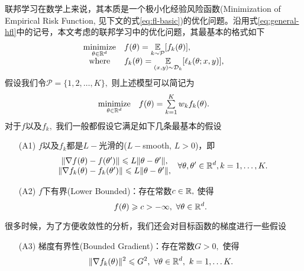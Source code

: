 联邦学习在数学上来说，其本质是一个极小化经验风险函数(Minimization of Empirical Risk Function, 见下文的式\eqref{eq:fl-basic})的优化问题。沿用式\eqref{eq:general-hfl}中的记号，本文考虑的联邦学习中的优化问题，其最基本的格式如下
\begin{equation}
\label{eq:fl-basic-dist}
\begin{array}{cl}
\operatorname*{minimize}\limits_{\theta \in \mathbb{R}^d} & f(\theta) = \operatorname*{\mathbb{E}}\limits_{k \sim {\mathcal{P}}} [f_k(\theta)], \\
\text{where} & f_k(\theta) = \operatorname*{\mathbb{E}}\limits_{(x, y) \sim \mathcal{D}_k} [\ell_k(\theta; x, y)],
\end{array}
\end{equation}
假设我们令$\mathcal{P} = \{1, 2, \ldots, K\},$ 则上述模型可以简记为
\begin{equation}
\label{eq:fl-basic}
\begin{array}{cl}
\operatorname*{minimize}\limits_{\theta \in \mathbb{R}^d} & f(\theta) = \sum\limits_{k=1}^K w_k f_k(\theta).
\end{array}
\end{equation}
对于$f$以及$f_k,$ 我们一般都假设它满足如下几条最基本的假设
\begin{itemize}
\item[(A1)] $f$以及$f_k$都是$L-$光滑的($L-$smooth, $L > 0$)，即
\begin{equation}
\label{eq:l-smooth}
\begin{array}{c}
\lVert \nabla f (\theta) - f (\theta') \rVert \leqslant L \lVert \theta - \theta' \rVert, \\
\lVert \nabla f_k (\theta) - f_k (\theta') \rVert \leqslant L \lVert \theta - \theta' \rVert,
\end{array}
~ \forall \theta, \theta' \in \mathbb{R}^d, k = 1, \ldots, K.
\end{equation}
\item[(A2)] $f$下有界(Lower Bounded)：存在常数$c \in \mathbb{R},$ 使得
\begin{equation}
\label{eq:lower-bounded}
f(\theta) \geqslant c > -\infty, ~ \forall \theta \in \mathbb{R}^d.
\end{equation}
\end{itemize}
很多时候，为了方便收敛性的分析，我们还会对目标函数的梯度进行一些假设
\begin{itemize}
\item[(A3)] 梯度有界性(Bounded Gradient)：存在常数$G > 0,$ 使得
\begin{equation}
\label{eq:bdd_grad}
\lVert \nabla f_k (\theta) \rVert^2 \leqslant G^2, ~ \forall \theta \in \mathbb{R}^d, ~ k = 1, \ldots K.
\end{equation}
\end{itemize}
